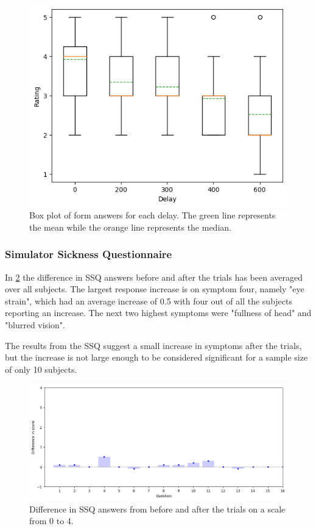 \documentclass[nofilelist]{cslthse-msc}
\begin{document}
\begin{figure}[!hbt]
   \centering
   \includegraphics[scale=0.6]{images/form-ans.png} 
   \caption{Box plot of form answers for each delay. The green line represents the mean while the orange line represents the median.}
   \label{fig:form-ans}
\end{figure}

\subsubsection{Simulator Sickness Questionnaire}
In \ref{fig:ssq-ans} the difference in SSQ answers before and after the trials has been averaged over all subjects. The largest response increase is on symptom four, namely "eye strain", which had an average increase of 0.5 with four out of all the subjects reporting an increase. The next two highest symptoms were "fullness of head" and "blurred vision". 

The results from the SSQ suggest a small increase in symptoms after the trials, but the increase is not large enough to be considered significant for a sample size of only 10 subjects.

\begin{figure}[!hbt]
   \centering
   \includegraphics[scale=0.6]{images/ssq-results.png} 
   \caption{Difference in SSQ answers from before and after the trials on a scale from 0 to 4.}
   \label{fig:ssq-ans}
\end{figure}
\end{document}
